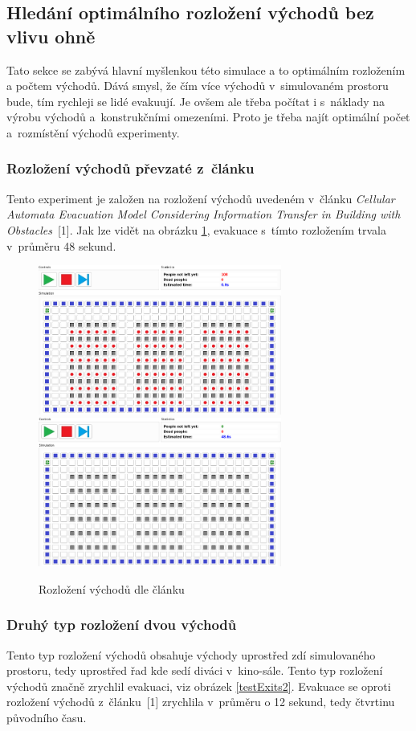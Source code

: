 \documentclass[11pt, titlepage, a4paper]{article}
\begin{document}
    \subsection{Hledání optimálního rozložení východů bez vlivu ohně}
    Tato sekce se zabývá hlavní myšlenkou této simulace a to optimálním rozložením a počtem východů. Dává smysl, že čím více východů v~simulovaném prostoru bude, tím rychleji se lidé evakuují. Je ovšem ale třeba počítat i s~náklady na výrobu východů a~konstrukčními omezeními. Proto je třeba najít optimální počet a~rozmístění východů experimenty.
    
        \subsubsection{Rozložení východů převzaté z~článku}
        Tento experiment je založen na rozložení východů uvedeném v~článku \textit{Cellular Automata Evacuation Model Considering Information Transfer in Building with Obstacles}~[1]. Jak lze vidět na obrázku \ref{testExits1}, evakuace s~tímto rozložením trvala v~průměru 48 sekund.
        
        \begin{figure}[H]
            \includegraphics[width=8cm]{ExitDistribution/ExitsFromPaper}
            \includegraphics[width=8cm]{ExitDistribution/ExitsFromPaperEnd}
            \caption{Rozložení východů dle článku}
            \label{testExits1}
        \end{figure}
        
        \subsubsection{Druhý typ rozložení dvou východů} \label{exitDist2}
        Tento typ rozložení východů obsahuje východy uprostřed zdí simulovaného prostoru, tedy uprostřed řad kde sedí diváci v~kino-sále. Tento typ rozložení východů značně zrychlil evakuaci, viz obrázek \ref{testExits2}. Evakuace se oproti rozložení východů z~článku~[1] zrychlila v~průměru o 12 sekund, tedy čtvrtinu původního času.
        
\end{document}
